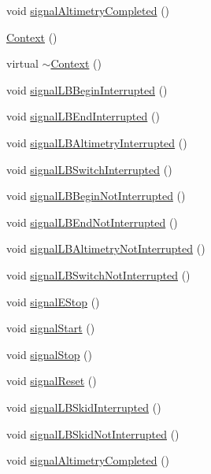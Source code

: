 \begin{DoxyCompactItemize}
void \hyperlink{class_context_a01e833c79e6ca0d21b419b3f6af9bbdc}{signal\+Altimetry\+Completed} ()
\item 
\hyperlink{class_context_a652cdcd2eedc8dbd9110bd284c5d5cf0}{Context} ()
\item 
virtual \hyperlink{class_context_a8be937c21e267c8d55decced9d1bcf90}{$\sim$\+Context} ()
\item 
void \hyperlink{class_context_a08df75859b851d2eca2d8e379214d6b5}{signal\+L\+B\+Begin\+Interrupted} ()
\item 
void \hyperlink{class_context_a9e9d5d85cafe8b295193f01fd2b7a8ee}{signal\+L\+B\+End\+Interrupted} ()
\item 
void \hyperlink{class_context_af78ea1902addcf137e8e7d99431592c6}{signal\+L\+B\+Altimetry\+Interrupted} ()
\item 
void \hyperlink{class_context_afdd121a466cf690038ede9b8c2a04160}{signal\+L\+B\+Switch\+Interrupted} ()
\item 
void \hyperlink{class_context_a9528945480d5072126031a6ce0d20b99}{signal\+L\+B\+Begin\+Not\+Interrupted} ()
\item 
void \hyperlink{class_context_a6debf81836f13909119658b40e32fe1c}{signal\+L\+B\+End\+Not\+Interrupted} ()
\item 
void \hyperlink{class_context_acf97db4d70e7246a1d06e4166ece5de5}{signal\+L\+B\+Altimetry\+Not\+Interrupted} ()
\item 
void \hyperlink{class_context_a4fd603eec47acc8a3671b7bdd3bdfe6d}{signal\+L\+B\+Switch\+Not\+Interrupted} ()
\item 
void \hyperlink{class_context_a18bc1a709e3db9477e133f545f7cf66a}{signal\+E\+Stop} ()
\item 
void \hyperlink{class_context_a9fbe4299614bae2f11e92ed56cde640c}{signal\+Start} ()
\item 
void \hyperlink{class_context_ac729f3e2184382006588a438622f235f}{signal\+Stop} ()
\item 
void \hyperlink{class_context_a59ea683658907374dbe23125c11b1e93}{signal\+Reset} ()
\item 
void \hyperlink{class_context_a41c95a05dffe3e6d89ebe5a6522e3a6a}{signal\+L\+B\+Skid\+Interrupted} ()
\item 
void \hyperlink{class_context_a54d07729fce18877b7fa671e5622c2cd}{signal\+L\+B\+Skid\+Not\+Interrupted} ()
\item 
void \hyperlink{class_context_a01e833c79e6ca0d21b419b3f6af9bbdc}{signal\+Altimetry\+Completed} ()
\end{DoxyCompactItemize}


